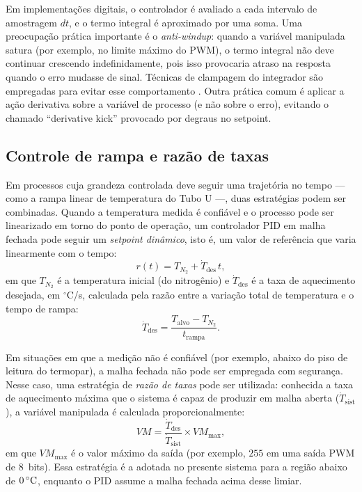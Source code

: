 Em implementa\c{c}\~oes digitais, o controlador \'e avaliado a cada intervalo de
amostragem $dt$, e o termo integral \'e aproximado por uma soma. Uma
preocupa\c{c}\~ao pr\'atica importante \'e o \emph{anti-windup}: quando a
vari\'avel manipulada satura (por exemplo, no limite m\'aximo do PWM), o termo
integral n\~ao deve continuar crescendo indefinidamente, pois isso provocaria
atraso na resposta quando o erro mudasse de sinal. T\'ecnicas de clampagem do
integrador s\~ao empregadas para evitar esse comportamento \cite{astrom2006}.
Outra pr\'atica comum \'e aplicar a a\c{c}\~ao derivativa sobre a vari\'avel de
processo (e n\~ao sobre o erro), evitando o chamado ``derivative kick''
provocado por degraus no setpoint.

\subsection{Controle de rampa e raz\~ao de taxas}

Em processos cuja grandeza controlada deve seguir uma trajet\'oria no tempo ---
como a rampa linear de temperatura do Tubo U ---, duas estrat\'egias podem ser
combinadas. Quando a temperatura medida \'e confi\'avel e o processo pode ser
linearizado em torno do ponto de opera\c{c}\~ao, um controlador PID em malha
fechada pode seguir um \emph{setpoint din\^amico}, isto \'e, um valor de
refer\^encia que varia linearmente com o tempo:
\begin{equation}
  r(t) = T_{N_2} + \dot{T}_{\mathrm{des}}\, t,
  \label{eq:setpoint}
\end{equation}
em que $T_{N_2}$ \'e a temperatura inicial (do nitrog\^enio) e $\dot{T}_{\mathrm{des}}$
\'e a taxa de aquecimento desejada, em $^{\circ}$C/s, calculada pela raz\~ao
entre a varia\c{c}\~ao total de temperatura e o tempo de rampa:
\begin{equation}
  \dot{T}_{\mathrm{des}} = \frac{T_{\mathrm{alvo}} - T_{N_2}}{t_{\mathrm{rampa}}}.
  \label{eq:taxa}
\end{equation}

Em situa\c{c}\~oes em que a medi\c{c}\~ao n\~ao \'e confi\'avel (por exemplo,
abaixo do piso de leitura do termopar), a malha fechada n\~ao pode ser
empregada com seguran\c{c}a. Nesse caso, uma estrat\'egia de
\emph{raz\~ao de taxas} pode ser utilizada: conhecida a taxa de aquecimento
m\'axima que o sistema \'e capaz de produzir em malha aberta
($\dot{T}_{\mathrm{sist}}$), a vari\'avel manipulada \'e calculada
proporcionalmente:
\begin{equation}
\textstyle
  VM = \frac{\dot{T}_{\mathrm{des}}}{\dot{T}_{\mathrm{sist}}} \times VM_{\max},
  \label{eq:razao}
\end{equation}
em que $VM_{\max}$ \'e o valor m\'aximo da sa\'ida (por exemplo,
$255$ em uma sa\'ida PWM de 8~bits). Essa estrat\'egia \'e a adotada no presente
sistema para a regi\~ao abaixo de $0\,\celsius$, enquanto o PID assume a malha
fechada acima desse limiar.

